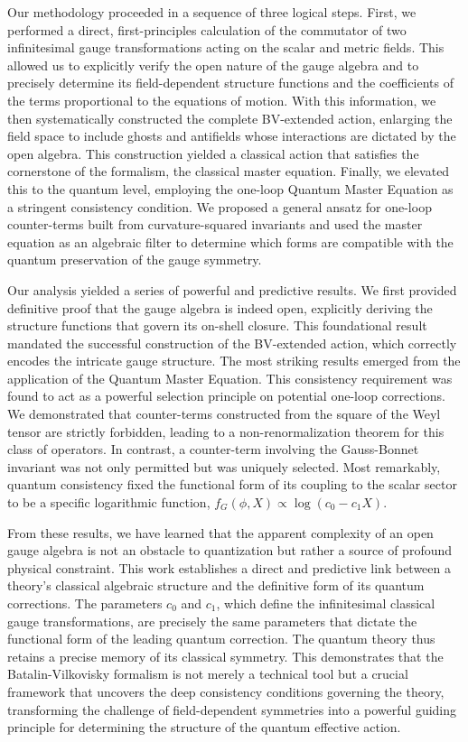\documentclass[twocolumn]{aastex631}
\begin{document}
Our methodology proceeded in a sequence of three logical steps. First, we performed a direct, first-principles calculation of the commutator of two infinitesimal gauge transformations acting on the scalar and metric fields. This allowed us to explicitly verify the open nature of the gauge algebra and to precisely determine its field-dependent structure functions and the coefficients of the terms proportional to the equations of motion. With this information, we then systematically constructed the complete BV-extended action, enlarging the field space to include ghosts and antifields whose interactions are dictated by the open algebra. This construction yielded a classical action that satisfies the cornerstone of the formalism, the classical master equation. Finally, we elevated this to the quantum level, employing the one-loop Quantum Master Equation as a stringent consistency condition. We proposed a general ansatz for one-loop counter-terms built from curvature-squared invariants and used the master equation as an algebraic filter to determine which forms are compatible with the quantum preservation of the gauge symmetry.

Our analysis yielded a series of powerful and predictive results. We first provided definitive proof that the gauge algebra is indeed open, explicitly deriving the structure functions that govern its on-shell closure. This foundational result mandated the successful construction of the BV-extended action, which correctly encodes the intricate gauge structure. The most striking results emerged from the application of the Quantum Master Equation. This consistency requirement was found to act as a powerful selection principle on potential one-loop corrections. We demonstrated that counter-terms constructed from the square of the Weyl tensor are strictly forbidden, leading to a non-renormalization theorem for this class of operators. In contrast, a counter-term involving the Gauss-Bonnet invariant was not only permitted but was uniquely selected. Most remarkably, quantum consistency fixed the functional form of its coupling to the scalar sector to be a specific logarithmic function, $f_G(\phi, X) \propto \log(c_0 - c_1 X)$.

From these results, we have learned that the apparent complexity of an open gauge algebra is not an obstacle to quantization but rather a source of profound physical constraint. This work establishes a direct and predictive link between a theory's classical algebraic structure and the definitive form of its quantum corrections. The parameters $c_0$ and $c_1$, which define the infinitesimal classical gauge transformations, are precisely the same parameters that dictate the functional form of the leading quantum correction. The quantum theory thus retains a precise memory of its classical symmetry. This demonstrates that the Batalin-Vilkovisky formalism is not merely a technical tool but a crucial framework that uncovers the deep consistency conditions governing the theory, transforming the challenge of field-dependent symmetries into a powerful guiding principle for determining the structure of the quantum effective action.

{}

\end{document}
